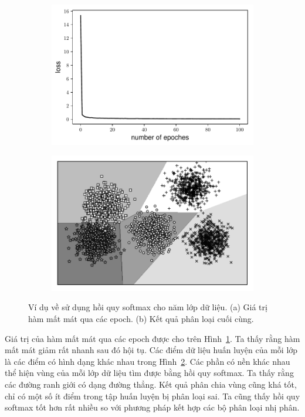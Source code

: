 \begin{figure}[t]
\begin{subfigure}{0.49\textwidth}
\includegraphics[width=0.99\linewidth]{ebookML_src/src/softmax_regression/softmax_loss.pdf}
\caption{}
\label{fig:13_exa}
\end{subfigure}
\begin{subfigure}{0.49\textwidth}
\includegraphics[width=0.99\linewidth]{ebookML_src/src/softmax_regression/softmax_5class.pdf}
\caption{}
\label{fig:13_exb}
\end{subfigure}
\caption{
Ví dụ về sử dụng hồi quy softmax cho năm lớp dữ liệu. (a) Giá trị hàm mất mát qua các
epoch. (b) Kết quả phân loại cuối cùng.
}
\label{fig:13_ex}
\end{figure}
Giá trị của hàm mất mát qua các epoch được cho trên Hình~\ref{fig:13_exa}. Ta
thấy rằng hàm mất mát giảm rất nhanh sau đó hội tụ. Các điểm dữ liệu huấn luyện
của mỗi lớp là các điểm có hình dạng khác nhau trong Hình~\ref{fig:13_exb}. Các
phần có nền khác nhau thể hiện vùng của mỗi lớp dữ liệu tìm được bằng hồi quy
softmax. Ta thấy rằng các đường ranh giới có dạng đường thẳng. Kết quả phân chia
vùng cũng khá tốt, chỉ có một số ít điểm trong tập huấn luyện bị phân loại sai.
Ta cũng thấy hồi quy softmax tốt hơn rất nhiều so với phương pháp kết hợp các bộ
phân loại nhị phân.

